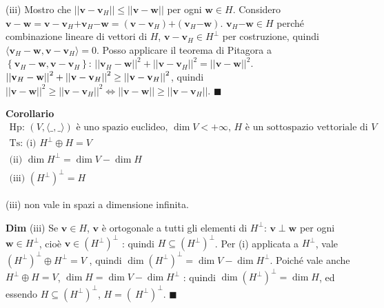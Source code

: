 \documentclass{article}
\begin{document}
(iii) Mostro che $\left\vert \left\vert \mathbf{v-v}_{H}\right\vert
\right\vert \leq \left\vert \left\vert \mathbf{v-w}\right\vert \right\vert $
per ogni $\mathbf{w}\in H$. Considero $\mathbf{v-w=v-v}_{H}\mathbf{+v}_{H}%
\mathbf{-w=}\left( \mathbf{v-v}_{H}\right) \mathbf{+}\left( \mathbf{v}_{H}%
\mathbf{-w}\right) $. $\mathbf{v}_{H}\mathbf{-w}\in H$ perch\'{e}
combinazione lineare di vettori di $H$, $\mathbf{v-v}_{H}\in H^{\perp }$ per
costruzione, quindi $\langle \mathbf{v}_{H}-\mathbf{w},\mathbf{v-v}%
_{H}\rangle =0$. Posso applicare il teorema di Pitagora a $\left\{ \mathbf{v}%
_{H}-\mathbf{w},\mathbf{v-v}_{H}\right\} $: $\left\vert \left\vert \mathbf{v}%
_{H}-\mathbf{w}\right\vert \right\vert ^{2}+\left\vert \left\vert \mathbf{v-v%
}_{H}\right\vert \right\vert ^{2}=\left\vert \left\vert \mathbf{v-w}%
\right\vert \right\vert ^{2}$. $\left\vert \left\vert \mathbf{v}_{H}-\mathbf{%
w}\right\vert \right\vert ^{2}+\left\vert \left\vert \mathbf{v-v}%
_{H}\right\vert \right\vert ^{2}\geq \left\vert \left\vert \mathbf{v-v}%
_{H}\right\vert \right\vert ^{2}$, quindi $\left\vert \left\vert \mathbf{v-w}%
\right\vert \right\vert ^{2}\geq \left\vert \left\vert \mathbf{v-v}%
_{H}\right\vert \right\vert ^{2}\Longleftrightarrow \left\vert \left\vert 
\mathbf{v-w}\right\vert \right\vert \geq \left\vert \left\vert \mathbf{v-v}%
_{H}\right\vert \right\vert $. $\blacksquare $

\textbf{Corollario}%
\begin{gather*}
\text{Hp}\text{: }\left( V,\langle \_,\_\mathbf{\rangle }\right) \text{ \`{e}
uno spazio euclideo, }\dim V<+\infty \text{, }H\text{ \`{e} un sottospazio
vettoriale di }V \\
\text{Ts}\text{: (i) }H^{\perp }\oplus H=V \\
\text{(ii) }\dim H^{\perp }=\dim V-\dim H \\
\text{(iii) }\left( H^{\perp }\right) ^{\perp }=H
\end{gather*}

(iii) non vale in spazi a dimensione infinita.

\textbf{Dim} (iii) Se $\mathbf{v}\in H$, $\mathbf{v}$ \`{e} ortogonale a
tutti gli elementi di $H^{\perp }$: $\mathbf{v\perp w}$ per ogni $\mathbf{w}%
\in H^{\perp }$, cio\`{e} $\mathbf{v}\in \left( H^{\perp }\right) ^{\perp }$%
: quindi $H\subseteq \left( H^{\perp }\right) ^{\perp }$. Per (i) applicata
a $H^{\perp }$, vale $\left( H^{\perp }\right) ^{\perp }\oplus H^{\perp }=V$%
, quindi $\dim \left( H^{\perp }\right) ^{\perp }=\dim V-\dim H^{\perp }$.
Poich\'{e} vale anche $H^{\perp }\oplus H=V$, $\dim H=\dim V-\dim H^{\perp }$%
: quindi $\dim \left( H^{\perp }\right) ^{\perp }=\dim H$, ed essendo $%
H\subseteq \left( H^{\perp }\right) ^{\perp }$, $H=\left( \ H^{\perp
}\right) ^{\perp }$. $\blacksquare $
\end{document}
